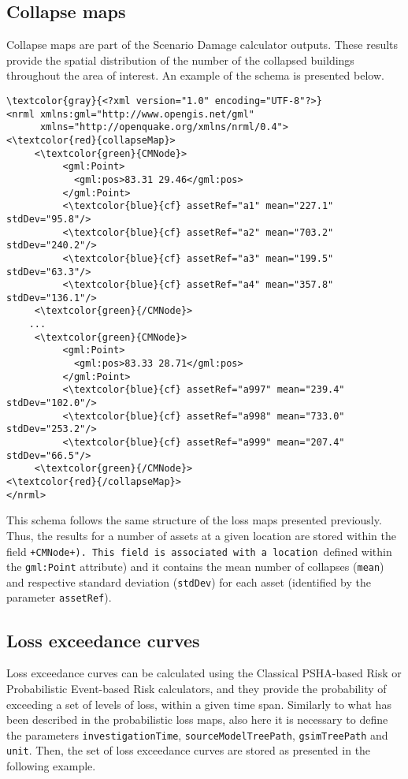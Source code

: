 \subsection{Collapse maps}
Collapse maps are part of the Scenario Damage calculator outputs. These results provide the spatial distribution of the number of the collapsed buildings throughout the area of interest. An example of the schema is presented below.

\begin{Verbatim}[frame=single, commandchars=\\\{\}, samepage=false]
\textcolor{gray}{<?xml version="1.0" encoding="UTF-8"?>}
<nrml xmlns:gml="http://www.opengis.net/gml"
      xmlns="http://openquake.org/xmlns/nrml/0.4">
<\textcolor{red}{collapseMap}>
     <\textcolor{green}{CMNode}>
          <gml:Point>
            <gml:pos>83.31 29.46</gml:pos>
          </gml:Point>
          <\textcolor{blue}{cf} assetRef="a1" mean="227.1" stdDev="95.8"/>
          <\textcolor{blue}{cf} assetRef="a2" mean="703.2" stdDev="240.2"/>
          <\textcolor{blue}{cf} assetRef="a3" mean="199.5" stdDev="63.3"/>
          <\textcolor{blue}{cf} assetRef="a4" mean="357.8" stdDev="136.1"/>
     <\textcolor{green}{/CMNode}>
    ...
     <\textcolor{green}{CMNode}>
          <gml:Point>
            <gml:pos>83.33 28.71</gml:pos>
          </gml:Point>
          <\textcolor{blue}{cf} assetRef="a997" mean="239.4" stdDev="102.0"/>
          <\textcolor{blue}{cf} assetRef="a998" mean="733.0" stdDev="253.2"/>
          <\textcolor{blue}{cf} assetRef="a999" mean="207.4" stdDev="66.5"/>
     <\textcolor{green}{/CMNode}>
<\textcolor{red}{/collapseMap}>
</nrml>
\end{Verbatim}

This schema follows the same structure of the loss maps presented previously. Thus, the results for a number of assets at a given location are stored within the field \Verb(+CMNode+). This field is associated with a location (defined within the \Verb+gml:Point+ attribute) and it contains the mean number of collapses (\Verb+mean+) and respective standard deviation (\Verb+stdDev+) for each asset (identified by the parameter \Verb+assetRef+).
   
\subsection{Loss exceedance curves}
Loss exceedance curves can be calculated using the Classical PSHA-based Risk or Probabilistic Event-based Risk calculators, and they provide the probability of exceeding a set of levels of loss, within a given time span. Similarly to what has been described in the probabilistic loss maps, also here it is necessary to define the parameters \Verb+investigationTime+, \Verb+sourceModelTreePath+, \Verb+gsimTreePath+ and \Verb+unit+. Then, the set of loss exceedance curves are stored as presented in the following example.

